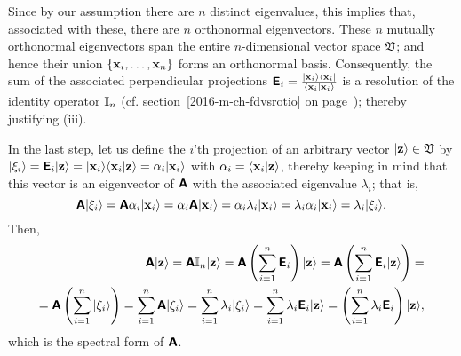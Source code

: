 {Since by our assumption there are $n$ distinct eigenvalues, this implies that, associated with these,
there are $n$ orthonormal eigenvectors.
These $n$ mutually orthonormal eigenvectors
span the entire $n$-dimensional vector space $\frak V$;
and hence their union $\{  {\bf x}_i, \ldots ,   {\bf x}_n\}$ forms an orthonormal basis.
Consequently, the sum of the associated perpendicular projections
$\textsf{\textbf{E}}_i = \frac{\vert {\bf x}_i \rangle \langle {\bf x}_i \vert}{\langle {\bf x}_i \vert {\bf x}_i  \rangle}$
is a resolution of the identity operator ${\Bbb I}_n$
(cf. section~\ref{2016-m-ch-fdvsrotio} on page~\pageref{2016-m-ch-fdvsrotio}); thereby justifying (iii).

In the last step, let us define the $i$'th projection of an arbitrary vector $\vert {\bf z}\rangle \in \frak V$
by
$
\vert {\xi}_i \rangle =  \textsf{\textbf{E}}_i  \vert  {\bf z} \rangle
=
\vert  {\bf x}_i \rangle \langle  {\bf x}_i   \vert  {\bf z} \rangle
= \alpha_i \vert  {\bf x}_i \rangle
$ with $
\alpha_i = \langle  {\bf x}_i   \vert  {\bf z} \rangle
$,
thereby keeping in mind that this vector
is an eigenvector of $\textsf{\textbf{A}}$  with the associated eigenvalue $\lambda_i$; that is,
\begin{equation}
\textsf{\textbf{A}} \vert {\xi}_i  \rangle
= \textsf{\textbf{A}}\alpha_i \vert  {\bf x}_i \rangle
= \alpha_i \textsf{\textbf{A}} \vert  {\bf x}_i \rangle
= \alpha_i \lambda_i \vert  {\bf x}_i  \rangle
= \lambda_i \alpha_i \vert  {\bf x}_i  \rangle
= \lambda_i \vert {\xi}_i\rangle .
\end{equation}
Then,
\begin{equation}
\begin{split}
\textsf{\textbf{A}} \vert {\bf z} \rangle =
\textsf{\textbf{A}} {\Bbb I}_n \vert {\bf z} \rangle=
\textsf{\textbf{A}} \left(\sum_{i=1}^n \textsf{\textbf{E}}_i\right) \vert {\bf z}\rangle  =
\textsf{\textbf{A}} \left(\sum_{i=1}^n \textsf{\textbf{E}}_i \vert {\bf z}\rangle \right) =     \\
=
\textsf{\textbf{A}} \left(\sum_{i=1}^n \vert {\xi}_i\rangle \right) =
 \sum_{i=1}^n \textsf{\textbf{A}} \vert {\xi}_i\rangle   =
 \sum_{i=1}^n \lambda_i \vert {\xi}_i \rangle   =
 \sum_{i=1}^n \lambda_i \textsf{\textbf{E}}_i   \vert {\bf z}\rangle =
\left( \sum_{i=1}^n \lambda_i \textsf{\textbf{E}}_i \right) \vert {\bf z}\rangle ,
\end{split}
\end{equation}
which is the spectral form of $\textsf{\textbf{A}}$.
\eproof
}

